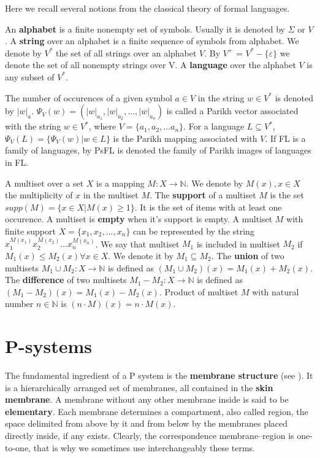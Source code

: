 \documentclass[a4paper,10pt]{article}
\def\eps{\varepsilon}
\begin{document}
Here we recall several notions from the classical theory of formal languages.

An {\bf alphabet} is a finite nonempty set of symbols. Usually it is denoted by $\Sigma$ or $V$. A {\bf string} over an alphabet is a finite sequence of symbols from alphabet. We denote by $V^*$ the set of all strings over an alphabet $V$. By $V^+$ = $V^* - \{\eps\}$ we denote the set of all nonempty strings over V. A {\bf language} over the alphabet $V$ is any subset of $V^*$.

The number of occurences of a given symbol $a\in V$ in the string $w\in V^*$ is denoted by $|w|_a$. $\Psi_V(w)=(|w|_{a_1},|w|_{a_2},\dots,|w|_{a_n})$ is called a Parikh vector associated with the string $w\in V^*$, where $V=\{a_1,a_2,\dots a_n\}$. For a language $L\subseteq V^*$, $\Psi_V(L)=\{\Psi_V(w)|w\in L\}$ is the Parikh mapping associated with $V$. If FL is a family of languages, by PsFL is denoted the family of Parikh images of languages in FL.

A multiset over a set $X$ is a mapping $M: X\rightarrow \mathbb N$. We denote by $M(x), x\in X$ the multiplicity of $x$ in the multiset $M$. The {\bf support} of a multiset $M$ is the set $supp(M)=\{x\in X|M(x)\geq 1\}$. It is the set of items with at least one occurence. A multiset is {\bf empty} when it's support is empty. A multiset $M$ with finite support $X = \{x_1, x_2, \dots, x_n\}$ can be represented by the string $x_1^{M(x_1)}x_2^{M(x_2)}\dots x_n^{M(x_n)}$. We say that multiset $M_1$ is included in multiset $M_2$ if $M_1(x)\leq M_2(x)\forall x \in X$. We denote it by $M_1\subseteq M_2$. The {\bf union} of two multisets $M_1\cup M_2 : X\rightarrow \mathbb N$ is defined as $(M_1\cup M_2)(x)=M_1(x)+M_2(x)$. The {\bf difference} of two multisets $M_1-M_2 : X\rightarrow \mathbb N$ is defined as $(M_1-M_2)(x)=M_1(x)-M_2(x)$. Product of multiset $M$ with natural number $n\in \mathbb N$ is $(n\cdot M)(x)=n\cdot M(x)$.
  
\section{P-systems}
\label{sec:p-systems}



The fundamental ingredient of a P system is the {\bf membrane structure} (see \cite{Paun2006Introduction}). It is a hierarchically arranged set of membranes, all contained in the {\bf skin membrane}. A membrane without any other membrane inside is said to be {\bf elementary}. Each membrane determines a compartment, also called region, the space delimited from above by it and from below by the membranes placed directly inside, if any exists. Clearly, the correspondence membrane–region is one-to-one, that is why we sometimes use interchangeably these terms.
\end{document}
